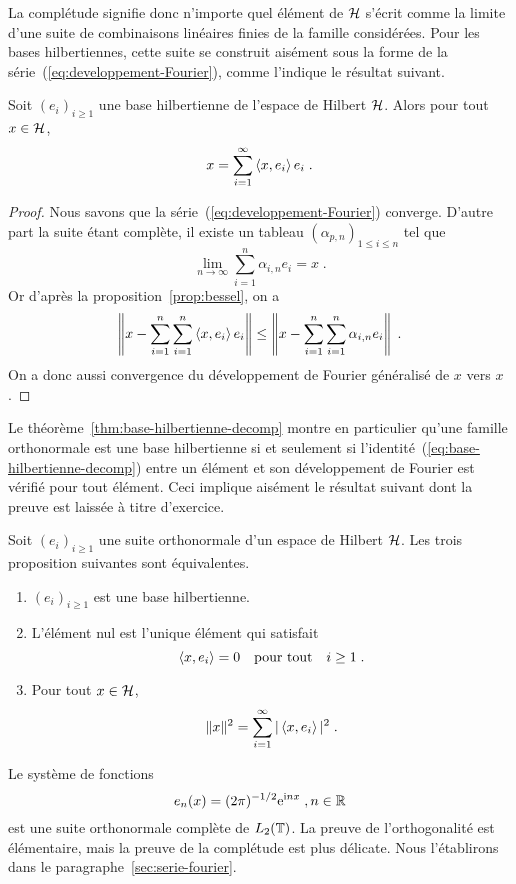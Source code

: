 La compl\'{e}tude signifie donc n'importe quel \'{e}l\'{e}ment de $\mathcal{H}$ s'\'{e}crit comme la
limite d'une suite de combinaisons lin\'{e}aires finies de la famille
consid\'{e}r\'{e}es. Pour les bases hilbertiennes, cette suite se construit ais\'{e}ment
sous la forme de la s\'{e}rie~(\ref{eq:developpement-Fourier}), comme l'indique le
r\'{e}sultat suivant.
\begin{theorem}
  \label{thm:base-hilbertienne-decomp}
Soit  $(e_i)_{i\geq1}$ une base hilbertienne de l'espace  de Hilbert
$\mathcal{H}$. Alors pour tout $x\in\mathcal{H}$,
\begin{equation}\label{eq:base-hilbertienne-decomp}
  x=\sum_{i=1}^\infty \left\langle x, e_i \right\rangle e_i\;.
\end{equation}
\end{theorem}
\begin{proof}\smartqed
  Nous savons que la s\'{e}rie~(\ref{eq:developpement-Fourier}) converge.
  D'autre part la suite \'{e}tant compl\`{e}te, il existe un tableau
  $(\alpha_{p,n})_{1\leq i\leq n}$ tel que
$$
\lim_{n\to\infty} \sum_{i=1}^n \alpha_{i,n} e_i = x\;.
$$
Or d'apr\`{e}s la proposition~\ref{prop:bessel}, on a
$$
\left\|x-\sum_{i=1}^n \sum_{i=1}^n \left\langle x, e_i \right\rangle e_i\right\|
\leq \left\|x-\sum_{i=1}^n \sum_{i=1}^n \alpha_{i,n} e_i\right\|\;.
$$
On a donc aussi convergence du d\'{e}veloppement de Fourier g\'{e}n\'{e}ralis\'{e} de $x$ vers
$x$.

\end{proof}
Le th\'{e}or\`{e}me~\ref{thm:base-hilbertienne-decomp} montre en particulier
qu'une famille orthonormale est une base hilbertienne si et seulement si
l'identit\'{e}~(\ref{eq:base-hilbertienne-decomp}) entre un \'{e}l\'{e}ment et son
d\'{e}veloppement de Fourier est v\'{e}rifi\'{e} pour tout \'{e}l\'{e}ment.
Ceci implique ais\'{e}ment
le r\'{e}sultat suivant dont la preuve est laiss\'{e}e \`{a} titre d'exercice.
\begin{theorem}
\label{theo:caracterisation-base-complete}
Soit $(e_i)_{i\geq1}$ une suite orthonormale  d'un espace de Hilbert $\mathcal{H}$.
Les trois proposition suivantes sont \'{e}quivalentes.
\begin{enumerate}[label=\emph{\alph*})]
\item $(e_i)_{i\geq1}$ est une base hilbertienne.
\item L'\'{e}l\'{e}ment nul est l'unique \'{e}l\'{e}ment qui satisfait
$$
\left\langle x, e_i \right\rangle=0\quad\text{pour tout}\quad i\geq1\;.
$$
\item Pour tout $x \in \mathcal{H}$,
\begin{equation}
\label{eq:parseval}
\|x\|^2 = \sum_{i=1}^\infty |\left\langle x, e_i \right\rangle|^2 \;.
\end{equation}
\end{enumerate}
\end{theorem}
\begin{example}
Le syst\`{e}me de fonctions
\[
e_n(x)= (2 \pi)^{-1/2} \mathrm{e}^{\mathrm{i} n x} \;, n \in \mathbb{R}
\]
est une suite orthonormale compl\`{e}te de $L_2(\mathbb{T})$. La preuve de
l'orthogonalit\'{e} est \'{e}l\'{e}mentaire, mais la preuve de la compl\'{e}tude est plus
d\'{e}licate. Nous l'\'{e}tablirons dans le paragraphe~\ref{sec:serie-fourier}.
\end{example}


